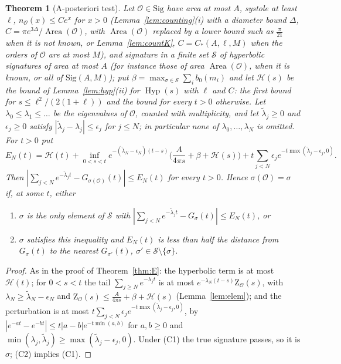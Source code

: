 \documentclass[pdflatex,sn-mathphys-num]{sn-jnl}
\theoremstyle{thmstyleone}%
\newtheorem{theorem}{Theorem}[section]%
\theoremstyle{thmstylethree}%
\newcommand{\Orb}{\mathcal{O}}
\newcommand{\Sig}{\mathrm{Sig}}
\newcommand{\Area}{\operatorname{Area}}
\newcommand{\Hyp}{\operatorname{Hyp}}
\newcommand{\cZ}{\mathrm{Z}}
\begin{document}
\begin{theorem}[A-posteriori test]\label{thm:post}
Let $\Orb\in\Sig$ have area at most $A$, systole at least $\ell$, $n_\Orb(x)\le Ce^x$ for $x>0$ (Lemma~\ref{lem:counting}(i) with a diameter bound $\Delta$, $C=\pi e^{3\Delta}/\Area(\Orb)$, with $\Area(\Orb)$ replaced by a lower bound such as $\frac\pi{21}$ when it is not known, or Lemma~\ref{lem:countK}, $C=C_*(A,\ell,M)$ when the orders of $\Orb$ are at most $M$), and signature in a finite set $\mathcal S$ of hyperbolic signatures of area at most $A$ (for instance those of area $\Area(\Orb)$, when it is known, or all of $\Sig(A,M)$); put $\beta=\max_{\sigma\in\mathcal S}\sum_ib_0(m_i)$ and let $\mathcal H(s)$ be the bound of Lemma~\ref{lem:hyp}(ii) for $\Hyp(s)$ with $\ell$ and $C$: the first bound for $s\le\ell^2/(2(1+\ell))$ and the bound for every $t>0$ otherwise. Let $\lambda_0\le\lambda_1\le\dots$ be the eigenvalues of $\Orb$, counted with multiplicity, and let $\tilde\lambda_j\ge0$ and $\epsilon_j\ge0$ satisfy $|\tilde\lambda_j-\lambda_j|\le\epsilon_j$ for $j\le N$; in particular none of $\lambda_0,\dots,\lambda_N$ is omitted. For $t>0$ put
\[
  E_N(t)=\mathcal H(t)+\inf_{0<s<t}e^{-(\tilde\lambda_N-\epsilon_N)(t-s)}\Big(\frac A{4\pi s}+\beta+\mathcal H(s)\Big)+t\sum_{j<N}\epsilon_je^{-t\max(\tilde\lambda_j-\epsilon_j,0)} .
\]
Then $|\sum_{j<N}e^{-\tilde\lambda_jt}-G_{\sigma(\Orb)}(t)|\le E_N(t)$ for every $t>0$. Hence $\sigma(\Orb)=\sigma$ if, at some $t$, either
\begin{enumerate}[label=(C\arabic*)]
\item $\sigma$ is the only element of $\mathcal S$ with $|\sum_{j<N}e^{-\tilde\lambda_jt}-G_\sigma(t)|\le E_N(t)$, or
\item $\sigma$ satisfies this inequality and $E_N(t)$ is less than half the distance from $G_\sigma(t)$ to the nearest $G_{\sigma'}(t)$, $\sigma'\in\mathcal S\setminus\{\sigma\}$.
\end{enumerate}
\end{theorem}

\begin{proof}
As in the proof of Theorem~\ref{thm:E}: the hyperbolic term is at most $\mathcal H(t)$; for $0<s<t$ the tail $\sum_{j\ge N}e^{-\lambda_jt}$ is at most $e^{-\lambda_N(t-s)}\cZ_\Orb(s)$, with $\lambda_N\ge\tilde\lambda_N-\epsilon_N$ and $\cZ_\Orb(s)\le\frac A{4\pi s}+\beta+\mathcal H(s)$ (Lemma~\ref{lem:elem}); and the perturbation is at most $t\sum_{j<N}\epsilon_je^{-t\max(\tilde\lambda_j-\epsilon_j,0)}$, by $|e^{-at}-e^{-bt}|\le t|a-b|e^{-t\min(a,b)}$ for $a,b\ge0$ and $\min(\lambda_j,\tilde\lambda_j)\ge\max(\tilde\lambda_j-\epsilon_j,0)$. Under (C1) the true signature passes, so it is $\sigma$; (C2) implies (C1).
\end{proof}
\end{document}
